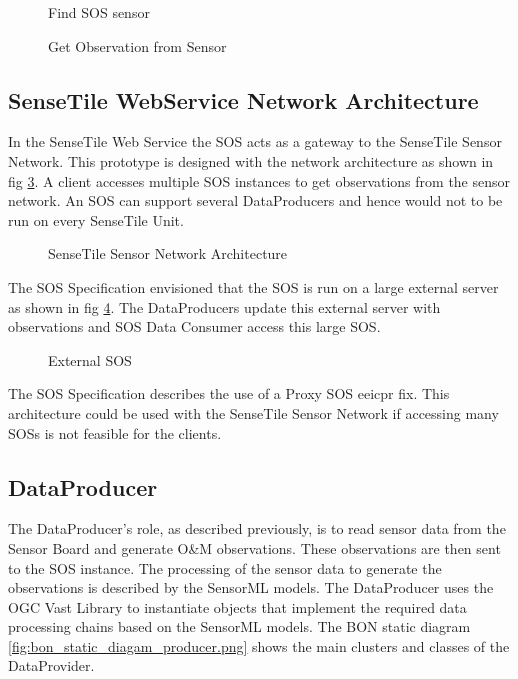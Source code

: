 \documentclass[]{final_report}
\begin{document}
\begin{figure}[h]
\centering
{}
\caption{Find SOS sensor}\label{fig:GetMeta}
\end{figure}

\begin{figure}[h]
\centering
{}
\caption{Get Observation from Sensor}\label{fig:GetObs}
\end{figure}
\newpage
\subsection{SenseTile WebService Network Architecture}
\label{subsec:SenseTile WebService Network Architecture}
In the SenseTile Web Service the SOS acts as a gateway to the SenseTile Sensor Network. This prototype is designed with the network architecture as shown in fig \ref{fig:Deployment_network}. A client accesses multiple SOS instances to get observations from the sensor network. An SOS can support several DataProducers and hence would not to be run on every SenseTile Unit. 

\begin{figure}[h]
\caption{SenseTile Sensor Network Architecture}\label{fig:Deployment_network}
\end{figure}
The SOS Specification envisioned that the SOS is run on a large external server as shown in fig \ref{fig:Deployment_ext_sos}. The DataProducers update this external server with observations and SOS Data Consumer access this large SOS.
\begin{figure}[h]
\centering
{}
\caption{External SOS}\label{fig:Deployment_ext_sos}
\end{figure}

The SOS Specification describes the use of a Proxy SOS eeicpr fix. This architecture could be used with the SenseTile Sensor Network if accessing many SOSs is not feasible for the clients.


\newpage
\subsection{DataProducer}\label{DataProducerHigh}
The DataProducer's role, as described previously, is to read sensor data from the Sensor Board and generate O\&M observations. These observations are then sent to the SOS instance. The processing of the sensor data to generate the observations is described by the SensorML models. The DataProducer uses the OGC Vast Library to instantiate objects that implement the required data processing chains based on the SensorML models. The BON static diagram \ref{fig:bon_static_diagam_producer.png}
 shows the main clusters and classes of the DataProvider.
\end{document}
